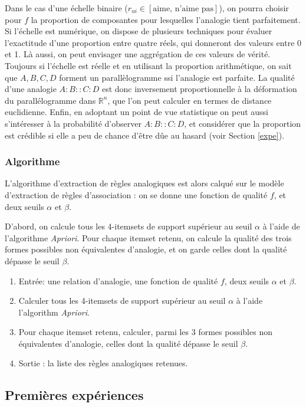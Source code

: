 Dans le cas d'une échelle binaire ($r_{ui} \in [\text{aime, n'aime pas}]$), on
pourra choisir pour $f$ la proportion de composantes pour lesquelles l'analogie
tient parfaitement.  Si l'échelle est numérique, on dispose de plusieurs
techniques pour évaluer l'exactitude d'une proportion entre quatre réels, qui
donneront des valeurs entre 0 et 1. Là aussi, on peut envisager une
aggrégation de ces valeurs de vérité.  Toujours si l'échelle est réelle et en
utilisant la proportion arithmétique, on sait que $A, B, C, D$ forment un
parallèlogramme ssi l'analogie est parfaite. La qualité d'une analogie
$A:B::C:D$ est donc inversement proportionnelle à la déformation du
parallélogramme dans $\mathbb{R}^n$, que l'on peut calculer en termes de
distance euclidienne.  Enfin, en adoptant un point de vue statistique on peut aussi
s'intéresser à la probabilité d'observer $A:B::C:D$, et considérer que la
proportion est crédible si elle a peu de chance d'être dûe au hasard (voir
Section \ref{expe}).

\subsubsection{Algorithme}
L'algorithme d'extraction de règles analogiques est alors calqué sur le modèle
d'extraction de règles d'association : on se donne une fonction de qualité $f$,
et deux seuils $\alpha$ et $\beta$. 

D'abord, on calcule tous les 4-itemsets de support supérieur au seuil $\alpha$
à   l'aide de l'algorithme \textit{Apriori}.  Pour chaque itemset retenu,
on calcule la qualité des trois formes possibles non équivalentes d'analogie, et on garde celles dont
la qualité dépasse le seuil $\beta$.

\begin{enumerate}
\item Entrée: une relation d'analogie, une fonction de qualité $f$, deux seuils
  $\alpha$ et $\beta$.
\item Calculer tous les 4-itemsets de support supérieur au seuil $\alpha$ à
  l'aide l'algorithm \textit{Apriori}.
\item Pour chaque itemset retenu, calculer, parmi les 3 formes possibles non
  équivalentes d'analogie, celles dont la qualité dépasse le seuil $\beta$.
\item Sortie : la liste des règles analogiques retenues.
\end{enumerate}

\subsection{Premières expériences}

